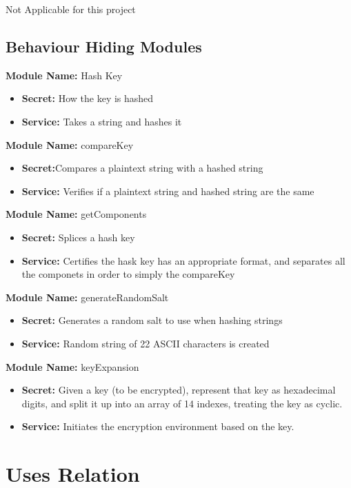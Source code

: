 \documentclass[12pt]{article}
\begin{document}
	Not Applicable for this project

\subsection{Behaviour Hiding Modules}

	\textbf{Module Name:} Hash Key
	\begin{itemize}
	  \item \textbf{Secret:} How the key is hashed
	  \item \textbf{Service:} Takes a string and hashes it
	\end{itemize}

	\textbf{Module Name:} compareKey
	\begin{itemize}
	  \item \textbf{Secret:}Compares a plaintext string with a hashed string
	  \item \textbf{Service:} Verifies if a plaintext string and hashed string are the same
	\end{itemize}

	\textbf{Module Name:} getComponents
	\begin{itemize}
	  \item \textbf{Secret:} Splices a hash key
	  \item \textbf{Service:} Certifies the hask key has an appropriate format, and separates all the componets in order to simply the compareKey
	\end{itemize}

	\textbf{Module Name:} generateRandomSalt
	\begin{itemize}
	  \item \textbf{Secret:} Generates a random salt to use when hashing strings
	  \item \textbf{Service:} Random string of 22 ASCII characters is created
	\end{itemize}

	\textbf{Module Name:} keyExpansion
	\begin{itemize}
	  \item \textbf{Secret:} Given a key (to be encrypted), represent that key as hexadecimal digits, and split it up into an array of 14 indexes, treating the key as cyclic.
	  \item \textbf{Service:}  Initiates the encryption environment based on the key.
	\end{itemize}


\section{Uses Relation}
\end{document}
